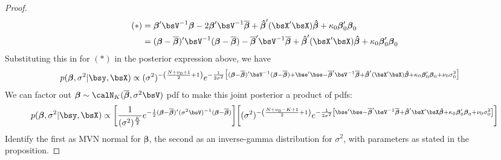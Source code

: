 \documentclass[12pt]{article}
\theoremstyle{plain}
\theoremstyle{definition}
\theoremstyle{remark}
\newcommand{\bsbeta}{\boldsymbol{\beta}}
\newcommand{\bshatbeta}{\boldsymbol{\hat{\beta}}}
\newcommand{\bsbarbeta}{\boldsymbol{\overline{\beta}}}
\begin{document}
\begin{proof}
\begin{align*}
  (*)
  &=
  \bsbeta'\bsV^{-1}\bsbeta
  - 2\bsbeta'\bsV^{-1}\bsbarbeta
  + \bshatbeta'(\bsX'\bsX)\bshatbeta
  + \kappa_0 \bsbeta_0'\bsbeta_0
  \\
  &=
  (\bsbeta-\bsbarbeta)'\bsV^{-1}(\bsbeta-\bsbarbeta)
  - \bsbarbeta' \bsV^{-1}\bsbarbeta
  + \bshatbeta'(\bsX'\bsX)\bshatbeta
  + \kappa_0 \bsbeta_0'\bsbeta_0
\end{align*}
Substituting this in for $(*)$ in the posterior expression above, we
have
\begin{align*}
  p(\bsbeta, \sigma^2 | \bsy,\bsX)
  &\propto
  (\sigma^2)^{-\left(\frac{N+\nu_0+1}{2}+1\right)}
  e^{%
    -\frac{1}{2\sigma^2}
    \big[
    (\bsbeta-\bsbarbeta)'\bsV^{-1}(\bsbeta-\bsbarbeta)
    +
    \bse'\bse
    - \bsbarbeta' \bsV^{-1}\bsbarbeta
    + \bshatbeta'(\bsX'\bsX)\bshatbeta
    + \kappa_0 \bsbeta_0'\bsbeta_0
    +\nu_0\sigma^2_0
    \big]
  }
\end{align*}
We can factor out $\bsbeta\sim \calN_K(\bsbarbeta,\sigma^2\bsV)$ pdf to
make this joint posterior a product of pdfs:
\begin{align*}
  p(\bsbeta, \sigma^2 | \bsy,\bsX)
  \propto
  \bigg[
  \frac{1}{(\sigma^2)^{\frac{K}{2}}}
  e^{%
    -\frac{1}{2}
    (\bsbeta-\bsbarbeta)'(\sigma^2\bsV)^{-1}(\bsbeta-\bsbarbeta)
  }
  \bigg]
  \bigg[
  (\sigma^2)^{-\left(\frac{N+\nu_0-K+1}{2}+1\right)}
  e^{%
    -\frac{1}{2\sigma^2}
    \left[
    \bse'\bse
    - \bsbarbeta'\bsV^{-1}\bsbarbeta
    + \bshatbeta'\bsX'\bsX\bshatbeta
    + \kappa_0\bsbeta_0'\bsbeta_0
    +\nu_0\sigma^2_0
    \right]
  }
  \bigg]
\end{align*}
Identify the first as MVN normal for $\bsbeta$, the second as an
inverse-gamma distribution for $\sigma^2$, with parameters as stated in
the proposition.
\end{proof}
\end{document}
